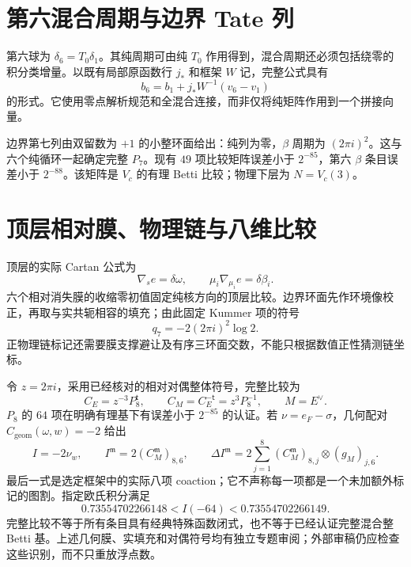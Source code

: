 \documentclass[11pt,a4paper,oneside]{ctexrep}
\theoremstyle{cnplain}
\theoremstyle{definition}
\theoremstyle{remark}
\begin{document}
\section{第六混合周期与边界 Tate 列}
第六球为 $\delta_6=T_0\delta_1$。其纯周期可由纯 $T_0$ 作用得到，混合周期还必须包括绕零的积分类增量。以既有局部原函数行 $j_*$ 和框架 $W$ 记，完整公式具有
\begin{equation}
 b_6=b_1+j_*W^{-1}(v_6-v_1)
\end{equation}
的形式。它使用零点解析规范和全混合连接，而非仅将纯矩阵作用到一个拼接向量。

边界第七列由双留数为 $+1$ 的小整环面给出：纯列为零，$\beta$ 周期为 $(2\pi i)^2$。这与六个纯循环一起确定完整 $P_7$。现有 $49$ 项比较矩阵误差小于 $2^{-85}$，第六 $\beta$ 条目误差小于 $2^{-88}$。该矩阵是 $V_c$ 的有理 Betti 比较；物理下层为 $N=V_c(3)$。

\section{顶层相对膜、物理链与八维比较}
顶层的实际 Cartan 公式为
\begin{equation}
 \nabla_s e=\delta\omega,\qquad
 \mu_i\nabla_{\mu_i}e=\delta\beta_i.
\end{equation}
六个相对消失膜的收缩零初值固定纯核方向的顶层比较。边界环面先作环境像校正，再取与实共轭相容的填充；由此固定 Kummer 项的符号
\begin{equation}
 q_7=-2(2\pi i)^2\log2.
\end{equation}
正物理链标记还需要膜支撑避让及有序三环面交数，不能只根据数值正性猜测链坐标。

令 $z=2\pi i$，采用已经核对的相对对偶整体符号，完整比较为
\begin{equation}
 C_E=z^{-3}P_8^{\mathsf t},\qquad C_M=C_E^{-\mathsf t}=z^3P_8^{-1},
 \qquad M=E^\vee.
\end{equation}
$P_8$ 的 $64$ 项在明确有理基下有误差小于 $2^{-85}$ 的认证。若 $\nu=e_F-\sigma$，几何配对 $C_{\mathrm{geom}}(\omega,w)=-2$ 给出
\begin{equation}
 I=-2\nu_w,\qquad I^{\mathfrak m}=2(C_M^{\mathfrak m})_{8,6},\qquad
 \Delta I^{\mathfrak m}=2\sum_{j=1}^8(C_M^{\mathfrak m})_{8,j}\otimes(g_M)_{j,6}.
\end{equation}
最后一式是选定框架中的实际八项 coaction；它不声称每一项都是一个未加额外标记的图割。指定欧氏积分满足
\begin{equation}
 0.73554702266148<I(-64)<0.73554702266149.
\end{equation}
完整比较不等于所有条目具有经典特殊函数闭式，也不等于已经认证完整混合整 Betti 基。上述几何膜、实填充和对偶符号均有独立专题审阅；外部审稿仍应检查这些识别，而不只重放浮点数。
\end{document}
